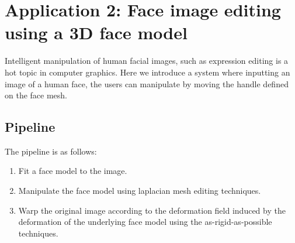\section{Application 2: Face image editing using a 3D face model}
Intelligent manipulation of human facial images, such as expression editing is a hot topic in computer graphics. Here we introduce a system where inputting an image of a human face, the users can manipulate by moving the handle defined on the face mesh.

\subsection{Pipeline}
The pipeline is as follows:
\begin{enumerate}
\item Fit a face model to the image.
\item Manipulate the face model using laplacian mesh editing techniques.
\item Warp the original image according to the deformation field induced by the deformation of the underlying face model using the as-rigid-as-possible techniques.
\end{enumerate}

